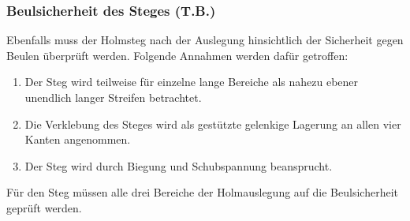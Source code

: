 \subsubsection{Beulsicherheit des Steges (T.B.)}
\label{Beulsicherheit Steg}
Ebenfalls muss der Holmsteg nach der Auslegung hinsichtlich der Sicherheit gegen Beulen überprüft werden. Folgende Annahmen werden dafür getroffen:\\
\begin{enumerate}
	\item Der Steg wird teilweise für einzelne lange Bereiche als nahezu ebener unendlich langer Streifen betrachtet.
	\item Die Verklebung des Steges wird als gestützte gelenkige Lagerung an allen vier Kanten angenommen.
	\item Der Steg wird durch Biegung und Schubspannung beansprucht.
\end{enumerate}
Für den Steg müssen alle drei Bereiche der Holmauslegung auf die Beulsicherheit geprüft werden. \\


